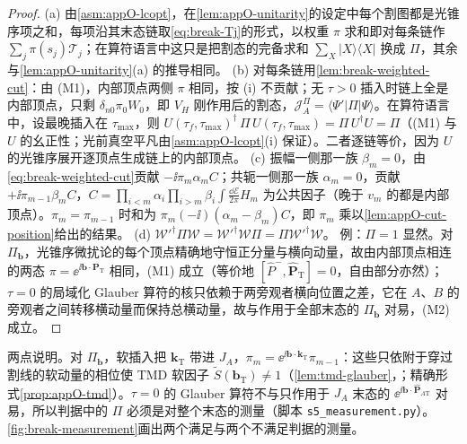 \begin{proof}
(a) 由\cref{asm:appO-lcopt}，在\cref{lem:appO-unitarity}的设定中每个割图都是光锥序项之和，每项沿其末态链取\cref{eq:break-Tj}的形式，以权重 $\pi$ 求和即对每条链作 $\sum_j\pi(s_j)\mathcal T_j$；在算符语言中这只是把割态的完备求和 $\sum_X|X\rangle\langle X|$ 换成 $\Pi$，其余与\cref{lem:appO-unitarity}(a) 的推导相同。
(b) 对每条链用\cref{lem:break-weighted-cut}：由 (M1)，内部顶点两侧 $\pi$ 相同，按 (i) 不贡献；无 $\tau>0$ 插入时链上全是内部顶点，只剩 $\delta_{n0}\pi_0W_0$，即 $V_H$ 刚作用后的割态，$\mathcal J_A^\Pi=\langle\Psi'|\Pi|\Psi\rangle$。在算符语言中，设最晚插入在 $\tau_{\max}$，则 $U(\tau_f,\tau_{\max})^\dagger\,\Pi\,U(\tau_f,\tau_{\max})=\Pi\,U^\dagger U=\Pi$（(M1) 与 $U$ 的幺正性；光前真空平凡由\cref{asm:appO-lcopt}(i) 保证）。二者逐链等价，因为 $U$ 的光锥序展开逐顶点生成链上的内部顶点。
(c) 振幅一侧那一族 $\beta_m=0$，由\cref{eq:break-weighted-cut}贡献 $-\ii\pi_m\alpha_mC$；共轭一侧那一族 $\alpha_m=0$，贡献 $+\ii\pi_{m-1}\beta_mC$，$C=\prod_{i<m}\alpha_i\prod_{i>m}\beta_i\int\frac{\dd\mathcal E}{2\pi}H_m$ 为公共因子（晚于 $v_m$ 的都是内部顶点）。$\pi_m=\pi_{m-1}$ 时和为 $\pi_m(-\ii)(\alpha_m-\beta_m)C$，即 $\pi_m$ 乘以\cref{lem:appO-cut-position}给出的结果。
(d) $\mathcal W'^\dagger\Pi\mathcal W=\mathcal W'^\dagger\mathcal W\Pi=\Pi\mathcal W'^\dagger\mathcal W$。
例：$\Pi=1$ 显然。对 $\Pi_{\boldsymbol b}$，光锥序微扰论的每个顶点精确地守恒正分量与横向动量，故由内部顶点相连的两态 $\pi=\ee^{\ii\boldsymbol b\cdot\boldsymbol P_{\mathrm T}}$ 相同，(M1) 成立（等价地 $[\hat P^-,\hat{\boldsymbol P}_{\mathrm T}]=0$，自由部分亦然）；$\tau=0$ 的局域化 Glauber 算符的核只依赖于两旁观者横向位置之差，它在 $A$、$B$ 的旁观者之间转移横动量而保持总横动量，故与作用于全部末态的 $\Pi_{\boldsymbol b}$ 对易，(M2) 成立。
\end{proof}

两点说明。对 $\Pi_{\boldsymbol b}$，软插入把 $\boldsymbol k_{\mathrm T}$ 带进 $J_A$，$\pi_m=\ee^{\ii\boldsymbol b\cdot\boldsymbol k_{\mathrm T}}\pi_{m-1}$：这些只依附于穿过割线的软动量的相位使 TMD 软因子 $\tilde S(\boldsymbol b_{\mathrm T})\neq1$（\cref{lem:tmd-glauber}，\tagA；精确形式\cref{prop:appO-tmd}）。$\tau=0$ 的 Glauber 算符不与只作用于 $J_A$ 末态的 $\ee^{\ii\boldsymbol b\cdot\hat{\boldsymbol P}_{A\mathrm T}}$ 对易，所以判据中的 $\Pi$ 必须是对整个末态的测量（脚本 \texttt{s5\_measurement.py}）。\cref{fig:break-measurement}画出两个满足与两个不满足判据的测量。

